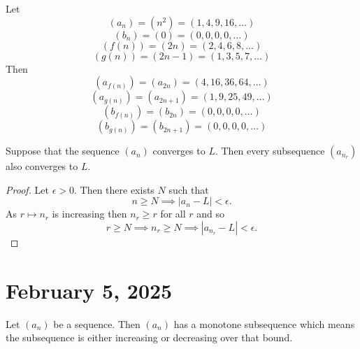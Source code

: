 \documentclass[11pt]{article}
\begin{document}
\begin{example}\label{2.4.3}
	Let
	\[
		(a_n) = \left( n^2 \right) = (1, 4, 9, 16, \ldots)
	\]
	\[
		(b_n) = (0) = (0, 0, 0, 0, \ldots)
	\]
	\[
		(f(n)) = (2n) = (2, 4, 6, 8, \ldots)
	\]
	\[
		(g(n)) = (2n - 1) = (1, 3, 5, 7, \ldots)
	\]
	Then
	\[
		(a_{f(n)}) = (a_{2n}) = (4, 16, 36, 64, \ldots)
	\]
	\[
		(a_{g(n)}) = (a_{2n+1}) = (1, 9, 25, 49, \ldots)
	\]
	\[
		(b_{f(n)}) = (b_{2n}) = (0, 0, 0, 0, \ldots)
	\]
	\[
		(b_{g(n)}) = (b_{2n+1}) = (0, 0, 0, 0, \ldots)
	\]
\end{example}

\begin{proposition}\label{2.4.4}
	Suppose that the sequence $(a_n)$ converges to $L$. Then every subsequence $(a_{n_r})$ also converges to $L$.
\end{proposition}

\begin{proof}
	Let $\epsilon > 0$. Then there exists $N$ such that
	\[
		n \geq N \implies |a_n - L| < \epsilon.
	\]
	As $r \mapsto n_r$ is increasing then $n_r \geq r$ for all $r$ and so
	\[
		r \geq N \implies n_r \geq N \implies |a_{n_r} - L| < \epsilon.
	\]
\end{proof}
\section{February 5, 2025}
\begin{theorem}\label{2.4.5}
	Let \((a_n)\) be a sequence. Then \((a_n)\) has a monotone subsequence which means the subsequence is either increasing or decreasing over that bound.
\end{theorem}
\begin{definition}

\end{definition}
\begin{center}
\end{center}
\end{document}
